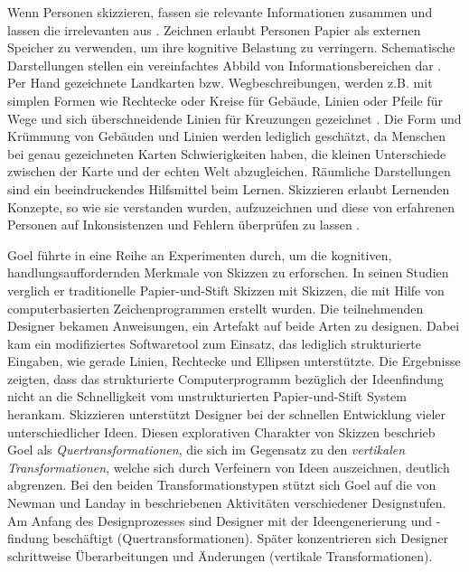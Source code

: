 \medskip Wenn Personen skizzieren, fassen sie relevante Informationen zusammen und lassen die irrelevanten aus \citep{Tversky:2002}. Zeichnen erlaubt Personen Papier als externen Speicher zu verwenden, um ihre kognitive Belastung zu verringern. Schematische Darstellungen stellen ein vereinfachtes Abbild von Informationsbereichen dar \citep{Tversky:2000}. Per Hand gezeichnete Landkarten bzw. Wegbeschreibungen, werden z.B. mit simplen Formen wie Rechtecke oder Kreise für Gebäude, Linien oder Pfeile für Wege und sich überschneidende Linien für Kreuzungen gezeichnet \citep{Tversky:1999}. Die Form und Krümmung von Gebäuden und Linien werden lediglich geschätzt, da Menschen bei genau gezeichneten Karten Schwierigkeiten haben, die kleinen Unterschiede zwischen der Karte und der echten Welt abzugleichen. Räumliche Darstellungen sind ein beeindruckendes Hilfsmittel beim Lernen. Skizzieren erlaubt Lernenden Konzepte, so wie sie verstanden wurden, aufzuzeichnen und diese von erfahrenen Personen auf Inkonsistenzen und Fehlern überprüfen zu lassen \citep{Forbus:2008}.

\medskip Goel führte in \citep{Goel:1995} eine Reihe an Experimenten durch, um die kognitiven, handlungsauffordernden Merkmale von Skizzen zu erforschen. In seinen Studien verglich er traditionelle Papier-und-Stift Skizzen mit Skizzen, die mit Hilfe von computerbasierten Zeichenprogrammen erstellt wurden. Die teilnehmenden Designer bekamen Anweisungen, ein Artefakt auf beide Arten zu designen. Dabei kam ein modifiziertes Softwaretool zum Einsatz, das lediglich strukturierte Eingaben, wie gerade Linien, Rechtecke und Ellipsen unterstützte.  Die Ergebnisse zeigten, dass das strukturierte Computerprogramm bezüglich der Ideenfindung nicht an die Schnelligkeit vom unstrukturierten Papier-und-Stift System herankam. Skizzieren unterstützt Designer bei der schnellen Entwicklung vieler unterschiedlicher Ideen. Diesen explorativen Charakter von Skizzen beschrieb Goel als \emph{Quertransformationen}, die sich im Gegensatz zu den \emph{vertikalen Transformationen}, welche sich durch Verfeinern von Ideen auszeichnen, deutlich abgrenzen. Bei den beiden Transformationstypen stützt sich Goel auf die von Newman und Landay in \citep{Newman:2000} beschriebenen Aktivitäten verschiedener Designstufen. Am Anfang des Designprozesses sind Designer mit der Ideengenerierung und -findung beschäftigt (Quertransformationen). Später konzentrieren sich Designer schrittweise Überarbeitungen und Änderungen (vertikale Transformationen).

